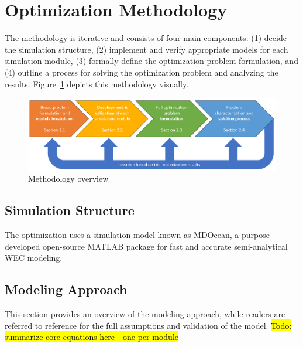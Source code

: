 \section{Optimization Methodology}\label{sec:optim-methods}
The methodology is iterative and consists of four main components: 
(1) decide the simulation structure, 
(2) implement and verify appropriate models for each simulation module, 
(3) formally define the optimization problem formulation, and 
(4) outline a process for solving the optimization problem and analyzing the results.
Figure~\ref{fig:overview-methods} depicts this methodology visually.
\begin{figure}
    \centering
    \includegraphics[width=1\linewidth]{figs/methodology_flowchart.pdf}
    \caption{Methodology overview}
    \label{fig:overview-methods}
\end{figure}
\subsection{Simulation Structure}
The optimization uses a simulation model known as MDOcean, a purpose-developed open-source MATLAB package for fast and accurate semi-analytical WEC modeling.


\subsection{Modeling Approach}
This section provides an overview of the modeling approach, while readers are referred to reference \cite{mccabe_development_2025} for the full assumptions and validation of the model.
\hl{Todo: summarize core equations here - one per module}